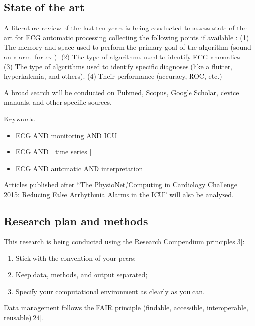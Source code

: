 \documentclass[runningheads]{llncs}
\providecommand{\tightlist}{%
  \setlength{\itemsep}{0pt}\setlength{\parskip}{0pt}}
\begin{document}
\hypertarget{state-of-the-art}{%
\subsection{State of the art}\label{state-of-the-art}}

A literature review of the last ten years is being conducted to assess
state of the art for ECG automatic processing collecting the following
points if available : (1) The memory and space used to perform the
primary goal of the algorithm (sound an alarm, for ex.). (2) The type of
algorithms used to identify ECG anomalies. (3) The type of algorithms
used to identify specific diagnoses (like a flutter, hyperkalemia, and
others). (4) Their performance (accuracy, ROC, etc.)

A broad search will be conducted on Pubmed, Scopus, Google Scholar,
device manuals, and other specific sources.

Keywords:

\begin{itemize}
\tightlist
\item
  ECG AND monitoring AND ICU
\item
  ECG AND {[} time series {]}
\item
  ECG AND automatic AND interpretation
\end{itemize}

Articles published after ``The PhysioNet/Computing in Cardiology
Challenge 2015: Reducing False Arrhythmia Alarms in the ICU'' will also
be analyzed.

\hypertarget{research-plan-and-methods}{%
\subsection{Research plan and methods}\label{research-plan-and-methods}}

This research is being conducted using the Research Compendium
principles{[}\protect\hyperlink{ref-compendium2019}{3}{]}:

\begin{enumerate}
\def\labelenumi{\arabic{enumi}.}
\tightlist
\item
  Stick with the convention of your peers;
\item
  Keep data, methods, and output separated;
\item
  Specify your computational environment as clearly as you can.
\end{enumerate}

Data management follows the FAIR principle (findable, accessible,
interoperable, reusable){[}\protect\hyperlink{ref-wilkinson2016}{24}{]}.
\end{document}
